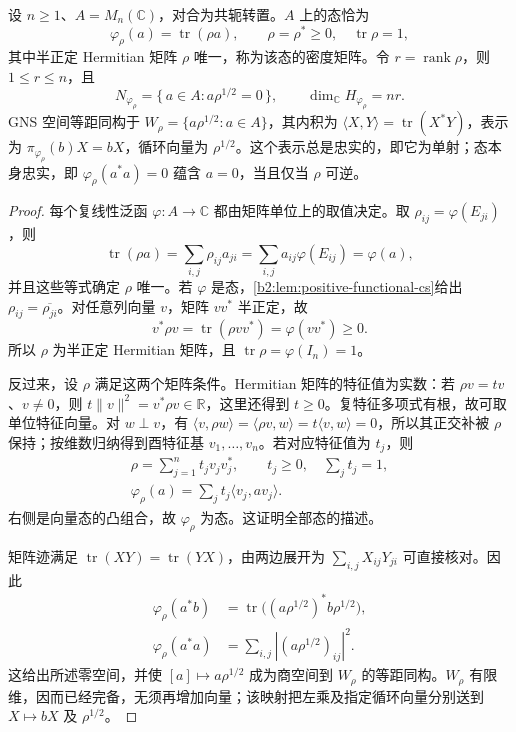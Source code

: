 \begin{proposition}\label{b2:prop:D-density-gns}
	设 \(n\ge1\)、\(A=M_n(\mathbb C)\)，对合为共轭转置。\(A\) 上的态恰为
	\[
		\varphi_\rho(a)=\operatorname{tr}(\rho a), \qquad \rho=\rho^*\ge0,\quad\operatorname{tr}\rho=1,
	\]
	其中半正定 Hermitian 矩阵 \(\rho\) 唯一，称为该态的密度矩阵。令 \(r=\operatorname{rank}\rho\)，则 \(1\le r\le n\)，且
	\[
		N_{\varphi_\rho}=\{\,a\in A:a\rho^{1/2}=0\,\}, \qquad \dim_{\mathbb C}H_{\varphi_\rho}=nr.
	\]
	GNS 空间等距同构于 \(W_\rho=\{a\rho^{1/2}:a\in A\}\)，其内积为 \(\langle X,Y\rangle=\operatorname{tr}(X^*Y)\)，表示为 \(\pi_{\varphi_\rho}(b)X=bX\)，循环向量为 \(\rho^{1/2}\)。这个表示总是忠实的，即它为单射；态本身忠实，即 \(\varphi_\rho(a^*a)=0\) 蕴含 \(a=0\)，当且仅当 \(\rho\) 可逆。
\end{proposition}
\begin{proof}
	每个复线性泛函 \(\varphi:A\to\mathbb C\) 都由矩阵单位上的取值决定。取 \(\rho_{ij}=\varphi(E_{ji})\)，则
	\[
		\operatorname{tr}(\rho a)=\sum_{i,j}\rho_{ij}a_{ji} =\sum_{i,j}a_{ij}\varphi(E_{ij})=\varphi(a),
	\]
	并且这些等式确定 \(\rho\) 唯一。若 \(\varphi\) 是态，\cref{b2:lem:positive-functional-cs}给出 \(\rho_{ij}=\overline{\rho_{ji}}\)。对任意列向量 \(v\)，矩阵 \(vv^*\) 半正定，故
	\[
		v^*\rho v=\operatorname{tr}(\rho vv^*)=\varphi(vv^*)\ge0.
	\]
	所以 \(\rho\) 为半正定 Hermitian 矩阵，且 \(\operatorname{tr}\rho=\varphi(I_n)=1\)。

	反过来，设 \(\rho\) 满足这两个矩阵条件。Hermitian 矩阵的特征值为实数：若 \(\rho v=t v\)、\(v\ne0\)，则 \(t\|v\|^2=v^*\rho v\in\mathbb R\)，这里还得到 \(t\ge0\)。复特征多项式有根，故可取单位特征向量。对 \(w\perp v\)，有 \(\langle v,\rho w\rangle=\langle\rho v,w\rangle=t\langle v,w\rangle=0\)，所以其正交补被 \(\rho\) 保持；按维数归纳得到酉特征基 \(v_1,\ldots,v_n\)。若对应特征值为 \(t_j\)，则
	\[
		\begin{gathered}
			\rho=\sum_{j=1}^n t_jv_jv_j^*,\qquad t_j\ge0,\quad \sum_jt_j=1,
			\\
			\varphi_\rho(a)=\sum_jt_j\langle v_j,av_j\rangle.
		\end{gathered}
	\]
	右侧是向量态的凸组合，故 \(\varphi_\rho\) 为态。这证明全部态的描述。

	矩阵迹满足 \(\operatorname{tr}(XY)=\operatorname{tr}(YX)\)，由两边展开为 \(\sum_{i,j}X_{ij}Y_{ji}\) 可直接核对。因此
	\[
		\begin{aligned}
			\varphi_\rho(a^*b) &=\operatorname{tr}\bigl((a\rho^{1/2})^*b\rho^{1/2}\bigr),\\
			\varphi_\rho(a^*a)&=\sum_{i,j}|(a\rho^{1/2})_{ij}|^2.
		\end{aligned}
	\]
	这给出所述零空间，并使 \([a]\mapsto a\rho^{1/2}\) 成为商空间到 \(W_\rho\) 的等距同构。\(W_\rho\) 有限维，因而已经完备，无须再增加向量；该映射把左乘及指定循环向量分别送到 \(X\mapsto bX\) 及 \(\rho^{1/2}\)。


\end{proof}
